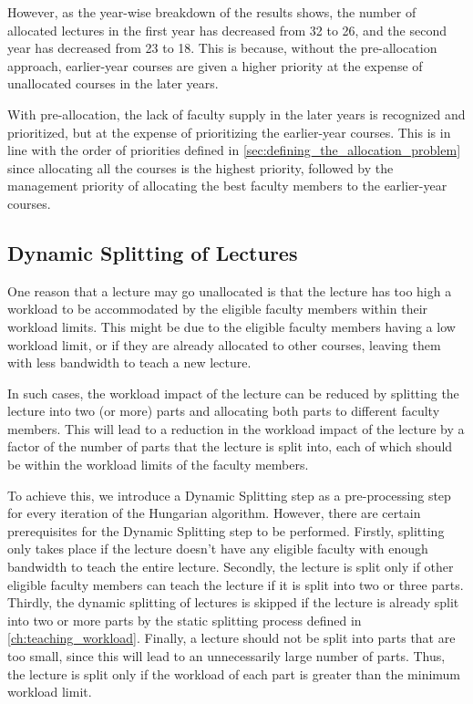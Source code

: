 However, as the year-wise breakdown of the results shows, the number of allocated lectures in the first year has decreased from 32 to 26, and the second year has decreased from 23 to 18. This is because, without the pre-allocation approach, earlier-year courses are given a higher priority at the expense of unallocated courses in the later years.

With pre-allocation, the lack of faculty supply in the later years is recognized and prioritized, but at the expense of prioritizing the earlier-year courses. This is in line with the order of priorities defined in \autoref{sec:defining_the_allocation_problem} since allocating all the courses is the highest priority, followed by the management priority of allocating the best faculty members to the earlier-year courses.


\subsection{Dynamic Splitting of Lectures}
\label{sec:dynamic_splitting}

One reason that a lecture may go unallocated is that the lecture has too high a workload to be accommodated by the eligible faculty members within their workload limits. This might be due to the eligible faculty members having a low workload limit, or if they are already allocated to other courses, leaving them with less bandwidth to teach a new lecture.

In such cases, the workload impact of the lecture can be reduced by splitting the lecture into two (or more) parts and allocating both parts to different faculty members. This will lead to a reduction in the workload impact of the lecture by a factor of the number of parts that the lecture is split into, each of which should be within the workload limits of the faculty members.

To achieve this, we introduce a Dynamic Splitting step as a pre-processing step for every iteration of the Hungarian algorithm. However, there are certain prerequisites for the Dynamic Splitting step to be performed. Firstly, splitting only takes place if the lecture doesn't have any eligible faculty with enough bandwidth to teach the entire lecture. Secondly, the lecture is split only if other eligible faculty members can teach the lecture if it is split into two or three parts. Thirdly, the dynamic splitting of lectures is skipped if the lecture is already split into two or more parts by the static splitting process defined in \autoref{ch:teaching_workload}. Finally, a lecture should not be split into parts that are too small, since this will lead to an unnecessarily large number of parts. Thus, the lecture is split only if the workload of each part is greater than the minimum workload limit.

